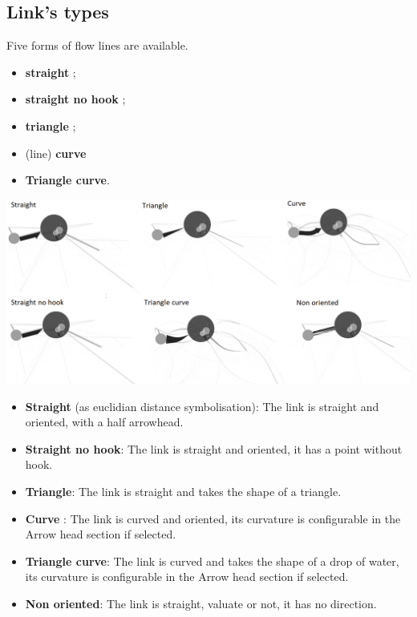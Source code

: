 \documentclass[
  letterpaper,
  DIV=11,
  numbers=noendperiod]{scrreprt}
\begin{document}
\subsection{\texorpdfstring{\textbf{Link's
types}}{Link's types}}\label{links-types}

Five forms of flow lines are available.

\begin{itemize}
\item
  \textbf{straight} ;
\item
  \textbf{straight no hook} ;
\item
  \textbf{triangle} ;
\item
  (line) \textbf{curve}
\item
  \textbf{Triangle curve}.
\end{itemize}

\includegraphics{images/Links_geom.png}

\begin{itemize}
\item
  \textbf{Straight} (as euclidian distance symbolisation): The link is
  straight and oriented, with a half arrowhead.
\item
  \textbf{Straight no hook}: The link is straight and oriented, it has a
  point without hook.
\item
  \textbf{Triangle}: The link is straight and takes the shape of a
  triangle.
\item
  \textbf{Curve} : The link is curved and oriented, its curvature is
  configurable in the Arrow head section if selected.
\item
  \textbf{Triangle curve}: The link is curved and takes the shape of a
  drop of water, its curvature is configurable in the Arrow head section
  if selected.
\item
  \textbf{Non oriented}: The link is straight, valuate or not, it has no
  direction.
\end{itemize}
\end{document}
